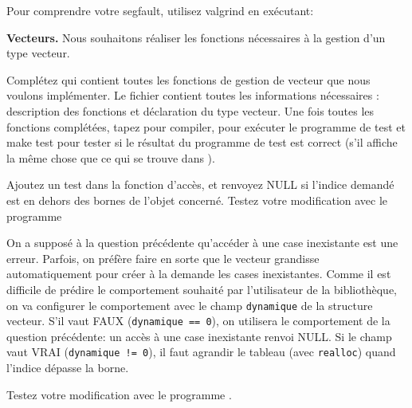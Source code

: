 \documentclass[10pt]{article}\usepackage[enonce]{exemptty}
\begin{document}
Pour comprendre votre segfault, utilisez valgrind en exécutant:

\begin{Exercice} \textbf{Vecteurs.}
  Nous souhaitons réaliser les fonctions nécessaires à la gestion d'un type
  vecteur.

  \Question Complétez  qui contient toutes les
  fonctions de gestion de vecteur que nous voulons implémenter. Le
  fichier  contient toutes les informations
  nécessaires : description des fonctions et déclaration du type
  vecteur. Une fois toutes les fonctions complétées, tapez  pour compiler,  pour exécuter le
  programme de test et make test pour tester si le résultat du
  programme de test est correct (s'il affiche la même chose que ce qui
  se trouve dans ).

  \Question Ajoutez un test dans la fonction d'accès, et renvoyez NULL
  si l'indice demandé est en dehors des bornes de l'objet
  concerné. Testez votre modification avec le programme

  \Question On a supposé à la question précédente qu'accéder à une
  case inexistante est une erreur. Parfois, on préfère faire en sorte
  que le vecteur grandisse automatiquement pour créer à la demande les
  cases inexistantes. Comme il est difficile de prédire le
  comportement souhaité par l'utilisateur de la bibliothèque, on va
  configurer le comportement avec le champ \texttt{dynamique} de la
  structure vecteur. S'il vaut FAUX (\texttt{dynamique == 0}), on
  utilisera le comportement de la question précédente: un accès à une
  case inexistante renvoi NULL. Si le champ vaut VRAI
  (\texttt{dynamique != 0}), il faut agrandir le tableau (avec
  \texttt{realloc}) quand l'indice dépasse la borne.

  Testez votre modification avec le programme .
\end{Exercice}
\end{document}
